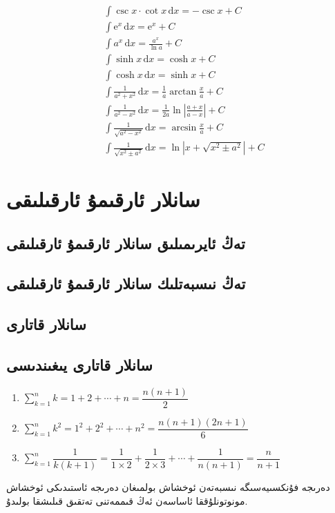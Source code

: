 \begin{align*}
     & \int\csc x \cdot\cot x \,\mathrm{d}x=-\csc x+C                                                                         \\[7pt]
     & \int \mathrm{e}^x \,\mathrm{d}x=\mathrm{e}^x+C                                                                         \\[7pt]
     & \int a^x\,\mathrm{d}x=\frac{a^x}{\ln a}+C                                                                              \\[7pt]
     & \int \sinh x\,\mathrm{d}x=\cosh x+C                                                                                    \\[7pt]
     & \int \cosh x\,\mathrm{d}x=\sinh x+C                                                                                    \\[7pt]
     & \int \frac{1}{a^2+x^2}\,\mathrm{d}x=\frac{1}{a}\arctan\frac{x}{a}+C                                                    \\[7pt]
     & \int \frac{1}{a^2-x^2}\,\mathrm{d}x=\frac{1}{2a}\ln \left|\frac{a+x}{a-x}\right|+C                                     \\[7pt]
     & \int \frac{1}{\sqrt{a^2-x^2}}\,\mathrm{d}x=\arcsin\frac{x}{a}+C                                                        \\[7pt]
     & \int \frac{1}{\sqrt{x^2\pm a^2}}\,\mathrm{d}x=\ln \left|x+\sqrt{x^2\pm a^2}\right|+C
\end{align*}

\section{سانلار ئارقىمۇ ئارقىلىقى}
\subsection{تەڭ ئايرىمىلىق سانلار ئارقىمۇ ئارقىلىقى}

\subsection{تەڭ نىسبەتلىك سانلار ئارقىمۇ ئارقىلىقى}

\subsection{سانلار قاتارى}

\subsection{سانلار قاتارى يىغىندىسى}
\begin{english}
\begin{enumerate}
    \item $\sum_{k=1}^nk=1+2+\cdots+n=\dfrac{n(n+1)}{2}$
    \item $\sum_{k=1}^nk^2=1^2+2^2+\cdots+n^2=\dfrac{n(n+1)(2n+1)}{6}$
    \item $\sum_{k=1}^n\dfrac{1}{k(k+1)}=\dfrac{1}{1\times 2}+\dfrac{1}{2\times 3}+\cdots+\dfrac{1}{n(n+1)}=\dfrac{n}{n+1}$
\end{enumerate}
\end{english}

دەرىجە فۇنكسىيەسىگە نىسبەتەن ئوخشاش بولمىغان دەرىجە ئاستىدىكى ئوخشاش مونوتونلۇققا ئاساسەن ئەڭ قىممەتنى تەتقىق قىلىشقا بولىدۇ.